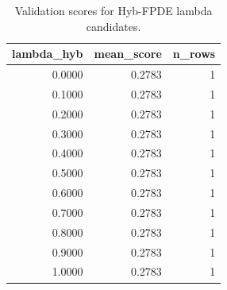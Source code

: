 \begin{table}[t]
\caption{Validation scores for Hyb-FPDE lambda candidates.}
\label{tab:lambda_distribution_computed}
\centering
\begin{tabular}{rrr}
\toprule
lambda\_hyb & mean\_score & n\_rows \\
\midrule
0.0000 & 0.2783 & 1 \\
0.1000 & 0.2783 & 1 \\
0.2000 & 0.2783 & 1 \\
0.3000 & 0.2783 & 1 \\
0.4000 & 0.2783 & 1 \\
0.5000 & 0.2783 & 1 \\
0.6000 & 0.2783 & 1 \\
0.7000 & 0.2783 & 1 \\
0.8000 & 0.2783 & 1 \\
0.9000 & 0.2783 & 1 \\
1.0000 & 0.2783 & 1 \\
\bottomrule
\end{tabular}

\end{table}
